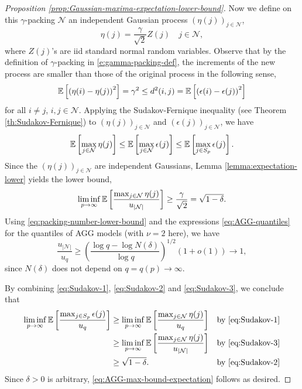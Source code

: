 \begin{proof}[Proposition \ref{prop:Gaussian-maxima-expectation-lower-bound}]
Now we define on this $\gamma$-packing $\mathcal{N}$ an independent Gaussian process $\left(\eta(j)\right)_{j\in\mathcal{N}}$, 
$$\eta(j) = \frac{\gamma}{\sqrt{2}}Z(j) \quad j\in \mathcal{N},$$
where $Z(j)$'s are iid standard normal random variables.
Observe that by the definition of $\gamma$-packing in \eqref{e:gamma-packing-def}, the increments of the new process are smaller than those of the original process in the following sense, 
$$
{\mathbb E}\left[\left(\eta(i)-\eta(j)\right)^2\right] = \gamma^2 \le d^2(i,j) = {\mathbb E}\left[\left(\epsilon(i)-\epsilon(j)\right)^2\right]
$$
for all $i\neq j$, $i,j\in\mathcal{N}$. Applying the Sudakov-Fernique inequality (see Theorem \ref{th:Sudakov-Fernique})
to  $\left(\eta(j)\right)_{j\in\mathcal{N}}$ and  $\left(\epsilon(j)\right)_{j\in\mathcal{N}}$, we have
\begin{equation}\label{eq:Sudakov-1}
{\mathbb E}\left[\max_{j\in\mathcal{N}}\eta(j)\right] \le {\mathbb E}\left[\max_{j\in\mathcal{N}}\epsilon(j)\right] \le {\mathbb E}\left[\max_{j\in{S_p}}\epsilon(j)\right].
\end{equation}
Since the $\left(\eta(j)\right)_{j\in\mathcal{N}}$ are independent Gaussians, Lemma \ref{lemma:expectation-lower} yields the lower bound,
\begin{equation}\label{eq:Sudakov-2}
\liminf_{p\to\infty} {\mathbb E}\left[\frac{\max_{j\in\mathcal{N}}\eta(j)}{u_{|\mathcal{N}|}}\right] \ge \frac{\gamma}{\sqrt{2}} = \sqrt{1-\delta}.
\end{equation}
Using \eqref{eq:packing-number-lower-bound} and the expressions \eqref{eq:AGG-quantiles} for the quantiles 
of AGG models (with $\nu=2$ here), we have
\begin{equation}\label{eq:Sudakov-3}
\frac{u_{|\mathcal{N}|}}{u_q} 
\ge \left(\frac{\log q-\log{N(\delta)}}{\log{q}}\right)^{1/2}\left(1+o(1)\right)\to 1,
\end{equation}
since $N(\delta)$ does not depend on $q= q(p)\to \infty$.

By combining \eqref{eq:Sudakov-1}, \eqref{eq:Sudakov-2} and \eqref{eq:Sudakov-3}, we conclude that
\begin{align*}
    \liminf_{p\to\infty} {\mathbb E}\left[\frac{\max_{j\in{S_p}}\epsilon(j)}{u_q}\right] 
    &\ge \liminf_{p\to\infty} {\mathbb E}\left[\frac{\max_{j\in\mathcal{N}}\eta(j)}{u_q}\right] &\text{by } \eqref{eq:Sudakov-1}\\
    &\ge \liminf_{p\to\infty} {\mathbb E}\left[\frac{\max_{j\in\mathcal{N}}\eta(j)}{u_{|\mathcal{N}|}}\right]  &\text{by } \eqref{eq:Sudakov-3} \\
    &\ge \sqrt{1-\delta}.  &\text{by } \eqref{eq:Sudakov-2}
\end{align*} 
Since $\delta>0$ is arbitrary, \eqref{eq:AGG-max-bound-expectation} follows as desired.
\end{proof}

